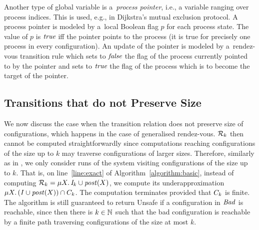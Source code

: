 Another type of global variable is a~\emph{process pointer}, i.e., a
variable ranging over process indices. This is used, e.g., in
Dijkstra's mutual exclusion
protocol. %
A process pointer is modeled by a~local Boolean flag $p$ for each
process state.  The value of $p$ is $\emph{true}$ iff the pointer points to
the process (it is true for precisely one process in every
configuration). An update of the pointer is modeled by a~rendez-vous
transition rule which sets to $\emph{false}$ the flag of the process
currently pointed to by the pointer and %
sets to $\emph{true}$ the flag of the process which is to become the target
of the pointer.

\subsection{Transitions that do not Preserve Size}
\label{section:nonsizepreserving}
We now discuss the case when the transition relation does not preserve size of configurations, which happens in the case of generalised rendez-vous.
$\mathcal{R}_{k}$ then cannot be computed straightforwardly since
computations reaching configurations of the size up to $k$ may traverse configurations of larger sizes.
Therefore, similarly as in \cite{Raskin:Viagra}, we only consider runs of the system visiting configurations of the size up to $k$.
That is, on line~\ref{line:exact} of Algorithm~\ref{algorithm:basic}, instead of computing
$\mathcal{R}_{k} = \mu X.\,\mathit{I}_k\cup\mathit{post}(X)$,
we compute its underapproximation 
$\mu X.\,(\mathit{I}\cup\mathit{post}(X))\cap C_{k}$.
The computation terminates provided that $C_{k}$ is finite.
The algorithm is still guaranteed to return Unsafe if a configuration in $\mathit{Bad}$ is reachable, 
since then there is $k\in\mathbb N$ such that the bad configuration is reachable by a finite path traversing configurations of the size at most $k$.




